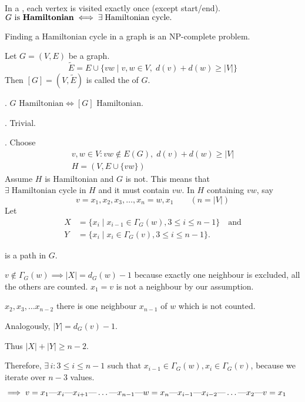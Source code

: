 \begin{definition}
In a , each vertex is visited exactly once (except start/end).
$\text{$G$ is \textbf{Hamiltonian}} \iff \exists\;\text{Hamiltonian cycle}.$
\end{definition}

Finding a Hamiltonian cycle in a graph is an NP-complete problem.

\begin{definition}
Let $G=(V,E)$ be a graph.
\[
\tilde E = E\cup \{vw \mid v,w\in V,\; d(v)+d(w) ≥ |V|\}
\]
Then $[G] = (V,\tilde E)$ is called the  of $G$.
\end{definition}

\Theorem.  $G\text{ Hamiltonian} \iff [G]\text{ Hamiltonian}.$

\ProofForward.
Trivial.

\ProofBackward.
Choose
\begin{gather*}
  v,w\in V: vw \not\in E(G),\;d(v)+d(w) ≥ |V| \\
  H=(V,E\cup \{vw\})
\end{gather*}
Assume $H$ is Hamiltonian and $G$ is not.
This means that $\exists\;\text{Hamiltonian cycle in $H$}$ and it must contain $vw$.
In $H$ containing $vw$, say
\[ v=x_1,x_2,x_3,\ldots,x_n=w,x_1 \qquad(n=|V|)\]
Let
\begin{align*}
    X &=\{x_i \mid x_{i-1}\in \Gamma_G(w), 3 ≤ i ≤ n-1 \}\quad\text{and} \\
    Y &=\{x_i \mid x_i\in \Gamma_G(v), 3 ≤ i ≤ n-1 \}.
\end{align*}

 is a path in $G$.

$v \not\in \Gamma_G(w) \implies |X| = d_G(w) - 1$
because exactly one neighbour is excluded, all the others are counted. $x_1= v$ is not a neighbour by our assumption.

$x_2, x_3, \ldots x_{n-2}$ there is one neighbour $x_{n-1}$ of $w$ which is not counted.

Analogously,
$|Y| = d_G(v) - 1$.

Thus $|X| + |Y| \geq n-2$.

Therefore, $\exists\,i: 3 ≤ i ≤ n-1$ such that
$x_{i-1}\in \Gamma_G(w), x_i\in\Gamma_G(v)$, because we iterate over $n-3$ values.

$\implies \path{v=x_1, x_i, x_{i+1}, \ldots, x_{n-1}, w=x_n, x_{i-1}, x_{i-2}, \ldots, x_2, v=x_1}$

